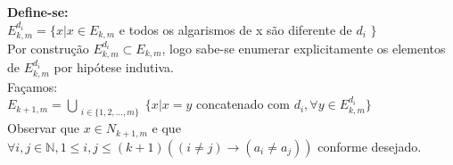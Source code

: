 \documentclass[twoside]{article}
\begin{document}
\begin{multicols}{2}
\textbf{Define-se:}\\
$E_{k,m}^{d_i} = \{ x | x \in E_{k,m}$ e todos os algarismos de x são diferente de $d_i$ $\}$\\

Por construção $E_{k,m}^{d_i} \subset E_{k,m}$, logo sabe-se enumerar explicitamente os elementos de $E_{k,m}^{d_i}$ por hipótese indutiva.\\

Façamos:\\
 $E_{k+1,m} = \bigcup_{\substack{ i \in \{1,2,\dots,m\}}} \{ x | x = y$ concatenado com $d_i, \forall y \in E_{k,m}^{d_i}  \}$\\

Observar que $x \in N_{k+1,m}$ e que $\forall i,j \in \mathbb{N}, 1 \leq i,j \leq (k+1) ((i \neq j) \rightarrow ( a_i \neq a_j ))$ conforme desejado.\\



\end{multicols}
\end{document}
